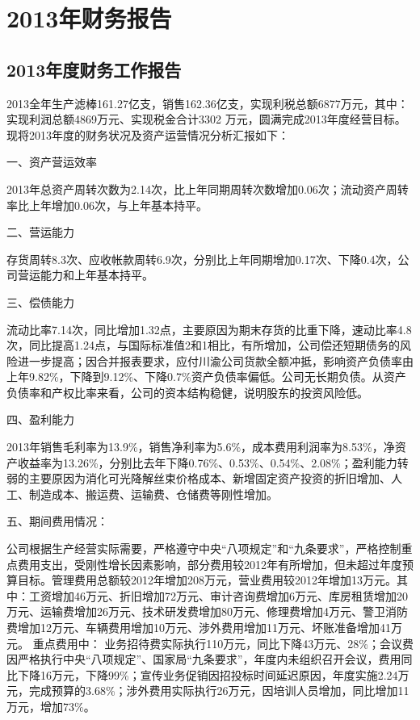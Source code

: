 ﻿\chapter{2013年财务报告}
\section{2013年度财务工作报告}

\indent
2013全年生产滤棒161.27亿支，销售162.36亿支，实现利税总额6877万元，其中：实现利润总额4869万元、实现税金合计3302 万元，圆满完成2013年度经营目标。现将2013年度的财务状况及资产运营情况分析汇报如下：

一、资产营运效率

2013年总资产周转次数为2.14次，比上年同期周转次数增加0.06次；流动资产周转率比上年增加0.06次，与上年基本持平。

二、营运能力

存货周转8.3次、应收帐款周转6.9次，分别比上年同期增加0.17次、下降0.4次，公司营运能力和上年基本持平。


三、偿债能力

流动比率7.14次，同比增加1.32点，主要原因为期末存货的比重下降，速动比率4.8次，同比提高1.24点，与国际标准值2和1相比，有所增加，公司偿还短期债务的风险进一步提高；因合并报表要求，应付川渝公司货款全额冲抵，影响资产负债率由上年9.82\%，下降到9.12\%、下降0.7\%资产负债率偏低。公司无长期负债。从资产负债率和产权比率来看，公司的资本结构稳健，说明股东的投资风险低。


四、盈利能力

    2013年销售毛利率为13.9\%，销售净利率为5.6\%，成本费用利润率为8.53\%，净资产收益率为13.26\%，分别比去年下降0.76\%、0.53\%、0.54\%、2.08\%；盈利能力转弱的主要原因为消化可光降解丝束价格成本、新增固定资产投资的折旧增加、人工、制造成本、搬运费、运输费、仓储费等刚性增加。


五、期间费用情况：

公司根据生产经营实际需要，严格遵守中央“八项规定”和“九条要求”，严格控制重点费用支出，受刚性增长因素影响，部分费用较2012年有所增加，但未超过年度预算目标。管理费用总额较2012年增加208万元，营业费用较2012年增加13万元。其中：工资增加46万元、折旧增加72万元、审计咨询费增加6万元、库房租赁增加20万元、运输费增加26万元、技术研发费增加80万元、修理费增加4万元、警卫消防费增加12万元、车辆费用增加10万元、涉外费用增加11万元、坏账准备增加41万元。
重点费用中：
业务招待费实际执行110万元，同比下降43万元、28\%；会议费因严格执行中央“八项规定”、国家局“九条要求”，年度内未组织召开会议，费用同比下降16万元，下降99\%；宣传业务促销因招投标时间延迟原因，年度实施2.24万元，完成预算的3.68\%；涉外费用实际执行26万元，因培训人员增加，同比增加11万元，增加73\%。

